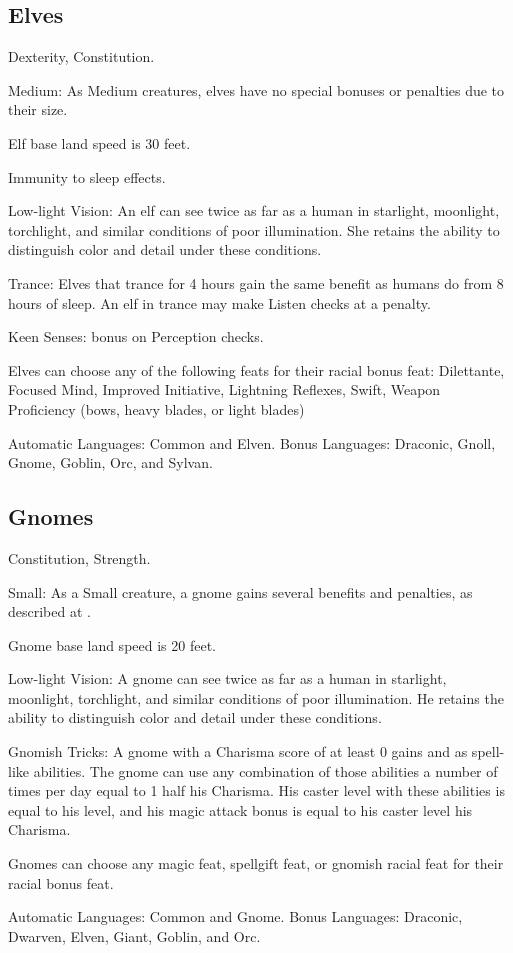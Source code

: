 \subsection{Elves}
\begin{itemize*}
\item {} Dexterity,  Constitution.
\item Medium: As Medium creatures, elves have no special bonuses or penalties due to their size.
\item Elf base land speed is 30 feet.
\item Immunity to sleep effects.
\item Low-light Vision: An elf can see twice as far as a human in starlight, moonlight, torchlight, and similar conditions of poor illumination. She retains the ability to distinguish color and detail under these conditions.
 \item Trance: Elves that trance for 4 hours gain the same benefit as humans do from 8 hours of sleep. An elf in trance may make Listen checks at a  penalty.
\item Keen Senses:  bonus on Perception checks.
\item Elves can choose any of the following feats for their racial bonus feat: Dilettante, Focused Mind, Improved Initiative, Lightning Reflexes, Swift, Weapon Proficiency (bows, heavy blades, or light blades)
\item Automatic Languages: Common and Elven. Bonus Languages: Draconic, Gnoll, Gnome, Goblin, Orc, and Sylvan.
\end{itemize*}

\subsection{Gnomes}
\begin{itemize*}
\item {} Constitution,  Strength.
\item Small: As a Small creature, a gnome gains several benefits and penalties, as described at .
\item Gnome base land speed is 20 feet.
\item Low-light Vision: A gnome can see twice as far as a human in starlight, moonlight, torchlight, and similar conditions of poor illumination. He retains the ability to distinguish color and detail under these conditions.
\item Gnomish Tricks: A gnome with a Charisma score of at least 0 gains  and  as spell-like abilities. The gnome can use any combination of those abilities a number of times per day equal to 1 \add half his Charisma. His caster level with these abilities is equal to his level, and his magic attack bonus is equal to his caster level \add his Charisma.

\item Gnomes can choose any magic feat, spellgift feat, or gnomish racial feat for their racial bonus feat.
\item Automatic Languages: Common and Gnome. Bonus Languages: Draconic, Dwarven, Elven, Giant, Goblin, and Orc.
\end{itemize*}


